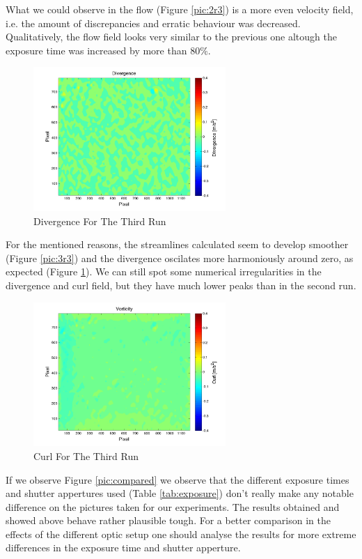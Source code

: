 What we could observe in the flow  (Figure \ref{pic:2r3}) is a more even velocity field, i.e. the amount of discrepancies and erratic behaviour was decreased. Qualitatively, the flow field looks very similar to the previous one altough the exposure time was increased by more than $80\%$. 


\begin{figure}[H]
\centering
\includegraphics[width=0.65\textwidth]{pics/figure4_run3.png}
\caption{Divergence For The Third Run}
\label{pic:4r3}
\end{figure}

For the mentioned reasons, the streamlines calculated seem to develop smoother (Figure \ref{pic:3r3}) and the divergence oscilates more harmoniously around zero, as expected (Figure \ref{pic:4r3}). We can still spot some numerical irregularities in the divergence and curl field, but they have much lower peaks than in the second run.


\begin{figure}[H]
\centering
\includegraphics[width=0.65\textwidth]{pics/figure5_run3.png}
\caption{Curl For The Third Run}
\label{pic:5r3}
\end{figure}

If we observe Figure \ref{pic:compared} we observe that the different exposure times and shutter appertures used (Table \ref{tab:exposure}) don't really make any notable difference on the pictures taken for our experiments. The results obtained and showed above behave rather plausible tough. For a better comparison in the effects of the different optic setup one should analyse the results for more extreme differences in the exposure time and shutter apperture. 

